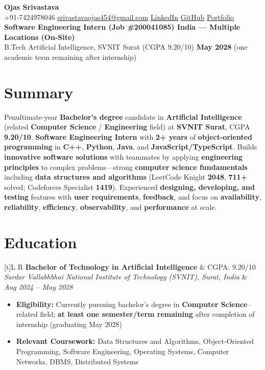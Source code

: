 \documentclass[a4paper,10pt]{article}
\newcommand{\resumeSubheading}[4]{%
  \vspace{0.5mm}
  \noindent
  \begin{tabularx}{\textwidth}[t]{L R}
    \textbf{#1} & #4 \\
    \textit{#3} & \textit{#2} \\
  \end{tabularx}
  \vspace{-0.5mm}%
}
\begin{document}
\selectfont

\begin{center}
  {\LARGE \textbf{Ojas Srivastava}} \\[1mm]
  \small
  +91-7424978046 \textbar{}
  \href{mailto:srivastavaojas454@gmail.com}{srivastavaojas454@gmail.com} \textbar{}
  \href{https://linkedin.com/in/ojas-srivastava05}{LinkedIn} \textbar{}
  \href{https://github.com/Ojas-Srivastava05}{GitHub} \textbar{}
  \href{https://ojas-srivastava.vercel.app}{Portfolio} \\[0.5mm]
  \textbf{Software Engineering Intern (Job \#200041085) \textbar{} India --- Multiple Locations (On-Site)} \\[0.3mm]
  B.Tech Artificial Intelligence, SVNIT Surat (CGPA 9.20/10) \textbar{}
  \textbf{May 2028} (one academic term remaining after internship)
\end{center}

\vspace{-1mm}

\section{Summary}
\small
Penultimate-year \textbf{Bachelor's degree} candidate in \textbf{Artificial Intelligence} (related \textbf{Computer Science} / \textbf{Engineering} field) at \textbf{SVNIT Surat}, CGPA \textbf{9.20/10}. \textbf{Software Engineering Intern} with \textbf{2+ years} of \textbf{object-oriented programming} in \textbf{C++}, \textbf{Python}, \textbf{Java}, and \textbf{JavaScript/TypeScript}. Builds \textbf{innovative software solutions} with teammates by applying \textbf{engineering principles} to complex problems---strong \textbf{computer science fundamentals} including \textbf{data structures and algorithms} (LeetCode Knight \textbf{2048}, \textbf{711+} solved; Codeforces Specialist \textbf{1419}). Experienced \textbf{designing, developing, and testing} features with \textbf{user requirements}, \textbf{feedback}, and focus on \textbf{availability}, \textbf{reliability}, \textbf{efficiency}, \textbf{observability}, and \textbf{performance} at scale.

\section{Education}
\small
\resumeSubheading
  {Bachelor of Technology in Artificial Intelligence}{Aug 2024 -- May 2028}
  {Sardar Vallabhbhai National Institute of Technology (SVNIT), Surat, India}{CGPA: 9.20/10}
\begin{itemize}
  \item \textbf{Eligibility:} Currently pursuing bachelor's degree in \textbf{Computer Science}--related field; \textbf{at least one semester/term remaining} after completion of internship (graduating May 2028)
  \item \textbf{Relevant Coursework:} Data Structures and Algorithms, Object-Oriented Programming, Software Engineering, Operating Systems, Computer Networks, DBMS, Distributed Systems
\end{itemize}
\end{document}
